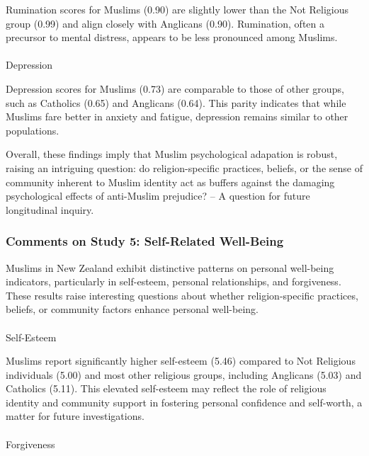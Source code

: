 \documentclass[
  single column]{article}
\makeatletter
\let\oldparagraph\paragraph
\renewcommand{\paragraph}{
    \@ifstar
      \xxxParagraphStar
      \xxxParagraphNoStar
  }
\newcommand{\xxxParagraphStar}[1]{\oldparagraph*{#1}\mbox{}}
\newcommand{\xxxParagraphNoStar}[1]{\oldparagraph{#1}\mbox{}}
\makeatother
\begin{document}
Rumination scores for Muslims (0.90) are slightly lower than the Not
Religious group (0.99) and align closely with Anglicans (0.90).
Rumination, often a precursor to mental distress, appears to be less
pronounced among Muslims.

\paragraph{Depression}\label{depression}

Depression scores for Muslims (0.73) are comparable to those of other
groups, such as Catholics (0.65) and Anglicans (0.64). This parity
indicates that while Muslims fare better in anxiety and fatigue,
depression remains similar to other populations.

Overall, these findings imply that Muslim psychological adapation is
robust, raising an intriguing question: do religion-specific practices,
beliefs, or the sense of community inherent to Muslim identity act as
buffers against the damaging psychological effects of anti-Muslim
prejudice? -- A question for future longitudinal inquiry.

\subsubsection{Comments on Study 5: Self-Related
Well-Being}\label{comments-on-study-5-self-related-well-being}

Muslims in New Zealand exhibit distinctive patterns on personal
well-being indicators, particularly in self-esteem, personal
relationships, and forgiveness. These results raise interesting
questions about whether religion-specific practices, beliefs, or
community factors enhance personal well-being.

\paragraph{Self-Esteem}\label{self-esteem}

Muslims report significantly higher self-esteem (5.46) compared to Not
Religious individuals (5.00) and most other religious groups, including
Anglicans (5.03) and Catholics (5.11). This elevated self-esteem may
reflect the role of religious identity and community support in
fostering personal confidence and self-worth, a matter for future
investigations.

\paragraph{Forgiveness}\label{forgiveness}
\end{document}
